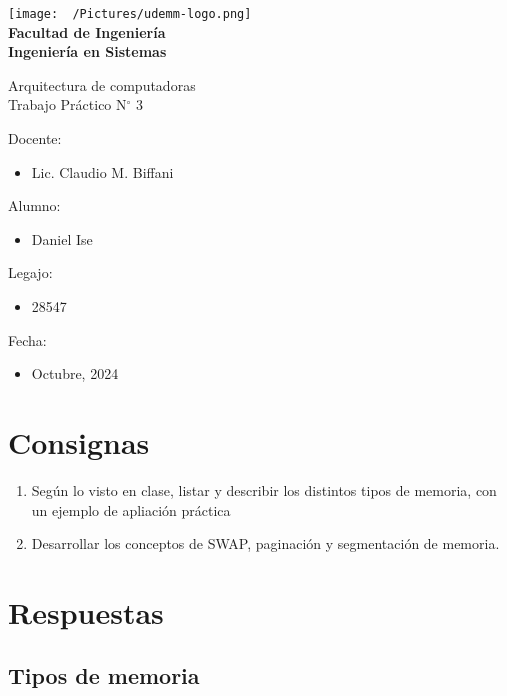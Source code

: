 \documentclass[12pt]{article}
\begin{document}
\thispagestyle{empty}

\begin{center}
  \vspace*{.5cm}
  \texttt{[image: ~/Pictures/udemm-logo.png]}\\
  \vspace{.2cm}
  \Large
  \textbf{Facultad de Ingeniería}\\
  \textbf{Ingeniería en Sistemas}\\
  \vspace{2cm}

  \Huge
  Arquitectura de computadoras\\
  Trabajo Práctico N\(^\circ\) 3\\
  \vfill

  \raggedright
  \Large
  Docente:
  \begin{itemize}
    \item[] Lic. Claudio M. Biffani \\
  \end{itemize}
  Alumno:
  \begin{itemize}
    \item[] Daniel Ise
  \end{itemize}
  Legajo:
  \begin{itemize}
    \item[] 28547
  \end{itemize}
  Fecha:
  \begin{itemize}
    \item[] Octubre, 2024
  \end{itemize}
\end{center}

\pagebreak

\tableofcontents

\pagebreak

\section{Consignas}

\begin{enumerate}
  \item Según lo visto en clase, listar y describir los distintos tipos de
        memoria, con un ejemplo de apliación práctica
  \item Desarrollar los conceptos de SWAP, paginación y segmentación de
        memoria.
\end{enumerate}

\section{Respuestas}

\subsection{Tipos de memoria}

\subsubsection{}
\end{document}

